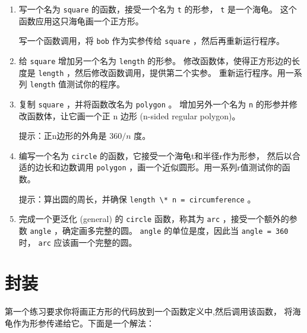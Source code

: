 \begin{enumerate}

\item 写一个名为 \lstinline{square} 的函数，接受一个名为 \lstinline{t} 的形参， \lstinline {t} 是一个海龟。 这个函数应用这只海龟画一个正方形。

写一个函数调用，将 \lstinline{bob} 作为实参传给 \lstinline{square} ，然后再重新运行程序。

\item 给 \lstinline{square} 增加另一个名为 \lstinline{length} 的形参。
 修改函数体，使得正方形边的长度是 \lstinline{length} ，然后修改函数调用，提供第二个实参。
 重新运行程序。用一系列 \lstinline{length} 值测试你的程序。

\item 复制 \lstinline{square} ，并将函数改名为 \lstinline{polygon} 。
   增加另外一个名为 \lstinline{n} 的形参并修改函数体，让它画一个正 n 边形 (n-sided regular polygon)。

提示：正n边形的外角是 $360/n$ 度。

\item 编写一个名为 \lstinline{circle} 的函数，它接受一个海龟t和半径r作为形参， 然后以合适的边长和边数调用 \lstinline{polygon} ，画一个近似圆形。用一系列r值测试你的函数。

提示：算出圆的周长，并确保 \lstinline{length \* n = circumference} 。

\item 完成一个更泛化 (general) 的 \lstinline{circle} 函数，称其为 \lstinline{arc} ，接受一个额外的参数 \lstinline{angle} ，确定画多完整的圆。 \lstinline{angle} 的单位是度，因此当 \lstinline{angle = 360} 时， \lstinline{arc} 应该画一个完整的圆。

  

\end{enumerate}


\section{封装}


第一个练习要求你将画正方形的代码放到一个函数定义中,然后调用该函数，
将海龟作为形参传递给它。下面是一个解法：

